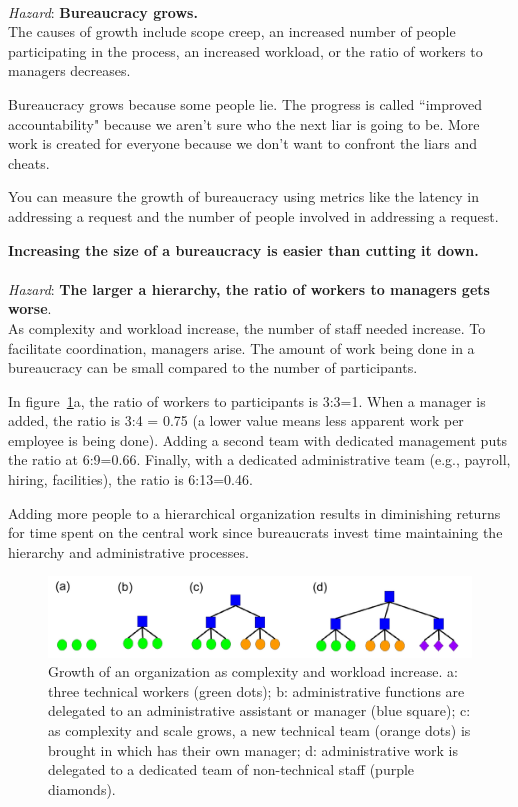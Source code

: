 \ \\
\textit{Hazard}: \textbf{Bureaucracy grows.}\\
The causes of growth include
scope creep, an increased number of people participating in the process, an increased workload, or the ratio of workers to managers decreases. 

Bureaucracy grows because some people lie. 
The progress is called ``improved accountability" because we aren't sure who the next liar is going to be.
More work is created for everyone because we don't want to confront the liars and cheats. 


You can measure the growth of bureaucracy using metrics like the latency in addressing a request and the number of people involved in addressing a request.  

\textbf{Increasing the size of a bureaucracy is easier than cutting it down.}\\


\ \\
\textit{Hazard}: \textbf{The larger a hierarchy, the ratio of workers to managers gets worse}. \\
As complexity and workload increase, the number of staff needed increase. To facilitate coordination, managers arise. The amount of work being done in a bureaucracy can be small compared to the number of participants.

In figure~\ref{fig:growth_of_bureaucracy}a, the ratio of workers to participants is 3:3=1. When a manager is added, the ratio is 3:4 = 0.75 (a lower value means less apparent work per employee is being done). Adding a second team with dedicated management puts the ratio at 6:9=0.66. Finally, with a dedicated administrative team (e.g., payroll, hiring, facilities), the ratio is 6:13=0.46.

Adding more people to a hierarchical organization results in diminishing returns for time spent on the central work since bureaucrats invest time maintaining the hierarchy and administrative processes.

    \begin{figure}
        \centering
        \includegraphics[width=1\textwidth]{images/growth-of-bureaucracy.pdf}
        \caption{Growth of an organization as complexity and workload increase. a: three technical workers (green dots); b: administrative functions are delegated to an administrative assistant or manager (blue square); c: as complexity and scale grows, a new technical team (orange dots) is brought in which has their own manager; d: administrative work is delegated to a dedicated team of non-technical staff (purple diamonds).}
        \label{fig:growth_of_bureaucracy}
    \end{figure}

